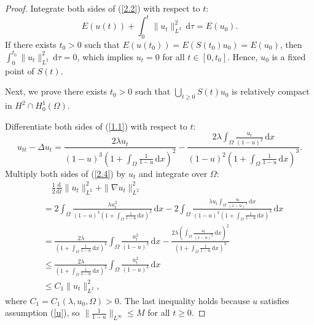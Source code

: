 \documentclass{article}
\numberwithin{equation}{section}
\begin{document}
\begin{proof}
Integrate both sides of (\ref{2.2}) with respect to $t$:
\begin{equation}
    E(u(t))+\int_{0}^{t}\|u_t\|_{L^2}^{2}\,\mathrm{d}\tau=E(u_0).\label{2.3}
\end{equation}
If there exists $t_0>0$ such that $E(u(t_0))=E(S(t_0)u_0)=E(u_0)$, then $\int_{0}^{t_0}\|u_t\|_{L^2}^{2}\,\mathrm{d}\tau=0$, which implies $u_t=0$ for all $t\in [0,t_0]$. Hence, $u_0$ is a fixed point of $S(t)$.

Next, we prove there exists $t_0>0$ such that $\bigcup_{t\ge 0}S(t)u_0$ is relatively compact in $H^2\cap H_0^1(\Omega)$.

Differentiate both sides of (\ref{1.1}) with respect to $t$:
\begin{equation}
  u_{tt}-\Delta u_t=\frac{2\lambda u_t}{(1-u)^3(1+\int_{\Omega}\frac{1}{1-u}\,\mathrm{d}x)^2}-\frac{2\lambda\int_{\Omega}\frac{u_t}{(1-u)^2}\,\mathrm{d}x}{(1-u)^2(1+\int_{\Omega}\frac{1}{1-u}\,\mathrm{d}x)^3}.\label{2.4}
\end{equation}
Multiply both sides of (\ref{2.4}) by $u_t$ and integrate over $\Omega$:
\begin{equation}
  \begin{aligned}
    &\quad\frac{1}{2}\frac{\mathrm{d}}{\mathrm{d}t}\|u_t\|_{L^2}^2+\|\nabla u_t\|_{L^2}^2\\
    &= 2\int_{\Omega}\frac{\lambda u_{t}^{2}}{(1-u)^3(1+\int_{\Omega}\frac{1}{1-u}\,\mathrm{d}x)^2}\,\mathrm{d}x-2\int_{\Omega}\frac{\lambda u_t\int_{\Omega}\frac{u_t}{(1-u)^2}\,\mathrm{d}x}{(1-u)^2(1+\int_{\Omega}\frac{1}{1-u}\,\mathrm{d}x)^3}\,\mathrm{d}x\\
    &= \frac{2\lambda}{(1+\int_{\Omega}\frac{1}{1-u}\,\mathrm{d}x)^2}\int_{\Omega}\frac{u_{t}^{2}}{(1-u)^3}\,\mathrm{d}x-\frac{2\lambda(\int_{\Omega}\frac{u_t}{(1-u)^2}\,\mathrm{d}x)^2}{(1+\int_{\Omega}\frac{1}{1-u}\,\mathrm{d}x)^3}\\
    &\le \frac{2\lambda}{(1+\int_{\Omega}\frac{1}{1-u}\,\mathrm{d}x)^2}\int_{\Omega}\frac{u_{t}^{2}}{(1-u)^3}\,\mathrm{d}x\\
    &\le C_1\|u_t\|_{L^2}^{2},
  \end{aligned}\label{2.5}
\end{equation}
where $C_1=C_1(\lambda,u_0,\Omega)>0$. The last inequality holds because $u$ satisfies assumption (\ref{u}), so $\|\frac{1}{1-u}\|_{L^\infty}\le M$ for all $t\ge 0$.


\end{proof}
\end{document}
